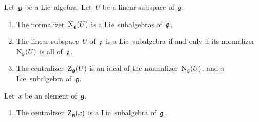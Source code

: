 \begin{proposition}
  Let~$\mathfrak{g}$ be a Lie~algebra.
  Let~$U$ be a linear subspace of~$\mathfrak{g}$.
  \begin{enumerate}
    \item
      The normalizer~$\operatorname{N}_{\mathfrak{g}}(U)$ is a Lie~subalgebras of~$\mathfrak{g}$.
    \item
      The linear subspace~$U$ of~$\mathfrak{g}$ is a Lie~subalgebra if and only if its normalizer~$\operatorname{N}_{\mathfrak{g}}(U)$ is all of~$\mathfrak{g}$.
    \item
      The centralizer~$\operatorname{Z}_{\mathfrak{g}}(U)$ is an ideal of the normalizer~$\operatorname{N}_{\mathfrak{g}}(U)$, and a Lie~subalgebra of~$\mathfrak{g}$.
  \end{enumerate}
  Let~$x$ be an element of~$\mathfrak{g}$.
  \begin{enumerate}[resume*]
    \item
      The centralizer~$\operatorname{Z}_{\mathfrak{g}}(x)$ is a Lie~subalgebra of~$\mathfrak{g}$.
 \end{enumerate}
\end{proposition}


